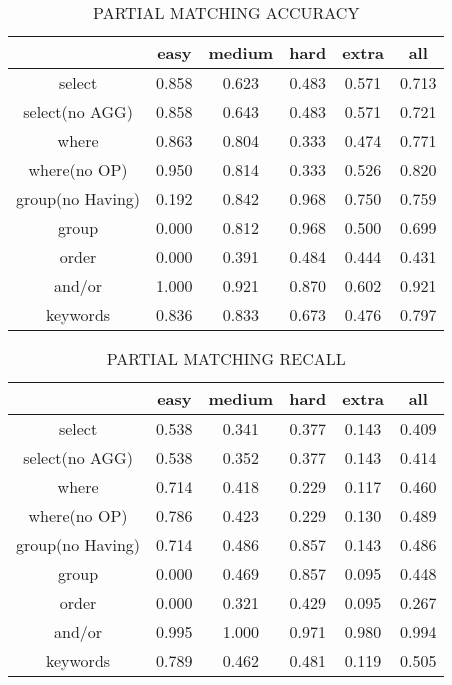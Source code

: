 \begin{table}[h!]
    \centering
    \begin{tabular}{|c|c|c|c|c|c|}
        \hline
                         & easy  & medium & hard  & extra & all   \\ \hline
        select           & 0.858 & 0.623  & 0.483 & 0.571 & 0.713 \\ \hline
        select(no AGG)   & 0.858 & 0.643  & 0.483 & 0.571 & 0.721 \\ \hline
        where            & 0.863 & 0.804  & 0.333 & 0.474 & 0.771 \\ \hline
        where(no OP)     & 0.950 & 0.814  & 0.333 & 0.526 & 0.820 \\ \hline
        group(no Having) & 0.192 & 0.842  & 0.968 & 0.750 & 0.759 \\ \hline
        group            & 0.000 & 0.812  & 0.968 & 0.500 & 0.699 \\ \hline
        order            & 0.000 & 0.391  & 0.484 & 0.444 & 0.431 \\ \hline
        and/or           & 1.000 & 0.921  & 0.870 & 0.602 & 0.921 \\ \hline

        keywords         & 0.836 & 0.833  & 0.673 & 0.476 & 0.797 \\ \hline
    \end{tabular}
    \caption{PARTIAL MATCHING ACCURACY}

\end{table}
\begin{table}[h!]
    \centering
    \begin{tabular}{|c|c|c|c|c|c|}
        \hline
                         & easy  & medium & hard  & extra & all   \\ \hline
        select           & 0.538 & 0.341  & 0.377 & 0.143 & 0.409 \\ \hline
        select(no AGG)   & 0.538 & 0.352  & 0.377 & 0.143 & 0.414 \\ \hline
        where            & 0.714 & 0.418  & 0.229 & 0.117 & 0.460 \\ \hline
        where(no OP)     & 0.786 & 0.423  & 0.229 & 0.130 & 0.489 \\ \hline
        group(no Having) & 0.714 & 0.486  & 0.857 & 0.143 & 0.486 \\ \hline
        group            & 0.000 & 0.469  & 0.857 & 0.095 & 0.448 \\ \hline
        order            & 0.000 & 0.321  & 0.429 & 0.095 & 0.267 \\ \hline
        and/or           & 0.995 & 1.000  & 0.971 & 0.980 & 0.994 \\ \hline

        keywords         & 0.789 & 0.462  & 0.481 & 0.119 & 0.505 \\ \hline
    \end{tabular}
    \caption{PARTIAL MATCHING RECALL }

\end{table}

